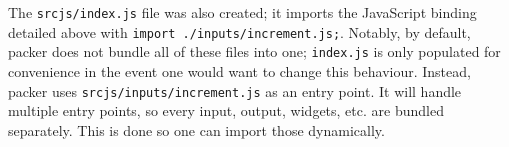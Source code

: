 \documentclass[
  10pt,
]{krantz}
\makeatletter
\newenvironment{Shaded}{\begin{snugshade}}{\end{snugshade}}
\newcommand{\AttributeTok}[1]{\textcolor[rgb]{0.61,0.61,0.61}{#1}}
\newcommand{\ControlFlowTok}[1]{\textcolor[rgb]{0.27,0.27,0.27}{\textbf{#1}}}
\newcommand{\DataTypeTok}[1]{\textcolor[rgb]{0.27,0.27,0.27}{#1}}
\newcommand{\KeywordTok}[1]{\textcolor[rgb]{0.27,0.27,0.27}{\textbf{#1}}}
\newcommand{\NormalTok}[1]{#1}
\newcommand{\OperatorTok}[1]{\textcolor[rgb]{0.43,0.43,0.43}{\textbf{#1}}}
\newcommand{\StringTok}[1]{\textcolor[rgb]{0.5,0.5,0.5}{#1}}
\newcommand{\VariableTok}[1]{\textcolor[rgb]{0,0,0}{#1}}
\newenvironment{kframe}{%
\medskip{}
\setlength{\fboxsep}{.8em}
 \def\at@end@of@kframe{}%
 \ifinner\ifhmode%
  \def\at@end@of@kframe{\end{minipage}}%
  \begin{minipage}{\columnwidth}%
 \fi\fi%
 \def\FrameCommand##1{\hskip\@totalleftmargin \hskip-\fboxsep
 \colorbox{shadecolor}{##1}\hskip-\fboxsep
     \hskip-\linewidth \hskip-\@totalleftmargin \hskip\columnwidth}%
 \MakeFramed {\advance\hsize-\width
   \@totalleftmargin\z@ \linewidth\hsize
   \@setminipage}}%
 {\par\unskip\endMakeFramed%
 \at@end@of@kframe}
\renewenvironment{Shaded}{\begin{kframe}}{\end{kframe}}
\makeatother
\begin{document}
\begin{Shaded}
\end{Shaded}

The \texttt{srcjs/index.js} file was also created; it imports the JavaScript binding detailed above with \texttt{import\ \textquotesingle{}./inputs/increment.js\textquotesingle{};}. Notably, by default, packer does not bundle all of these files into one; \texttt{index.js} is only populated for convenience in the event one would want to change this behaviour. Instead, packer uses \texttt{srcjs/inputs/increment.js} as an entry point. It will handle multiple entry points, so every input, output, widgets, etc. are bundled separately. This is done so one can import those dynamically.
\end{document}
